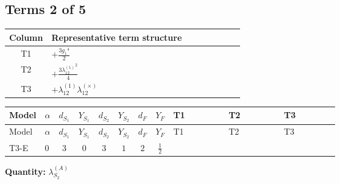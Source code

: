 \documentclass[8pt]{article}
\begin{document}
\begin{landscape}
\subsection*{Terms 2 of 5}
\begin{center}
\begin{tabular}{@{}c >{\raggedright\arraybackslash}p{0.82\linewidth}@{}}
\toprule
Column & Representative term structure \\
\midrule
T1 & \(\displaystyle +\frac{3 {g_1}^4}{2}\) \\
\midrule
T2 & \(\displaystyle +\frac{3 {\lambda_{12}^{(1)}}^2}{4}\) \\
\midrule
T3 & \(\displaystyle +{\lambda_{12}^{(1)}} {\lambda_{12}^{(\times)}}\) \\
\midrule
\bottomrule
\end{tabular}
\end{center}
\smallskip
\tiny
\begin{longtable}{@{}llcccccc >{\raggedright\arraybackslash}p{0.21\linewidth} >{\raggedright\arraybackslash}p{0.21\linewidth} >{\raggedright\arraybackslash}p{0.21\linewidth}@{}}
\toprule
Model & $\alpha$ & $d_{S_1}$ & $Y_{S_1}$ & $d_{S_2}$ & $Y_{S_2}$ & $d_F$ & $Y_F$ & T1 & T2 & T3 \\
\midrule
\endfirsthead
\toprule
Model & $\alpha$ & $d_{S_1}$ & $Y_{S_1}$ & $d_{S_2}$ & $Y_{S_2}$ & $d_F$ & $Y_F$ & T1 & T2 & T3 \\
\midrule
\endhead
T3-E & $0$ & $3$ & $0$ & $3$ & $1$ & $2$ & $\frac{1}{2}$ & \scriptsize\adjustbox{max width=\linewidth}{$\begin{gathered} +\frac{3 {g_1}^4}{2}\end{gathered}$} & \scriptsize\adjustbox{max width=\linewidth}{$\begin{gathered} +\frac{3 {\lambda_{12}^{(1)}}^2}{4}\end{gathered}$} & \scriptsize\adjustbox{max width=\linewidth}{$\begin{gathered} +{\lambda_{12}^{(1)}} {\lambda_{12}^{(\times)}}\end{gathered}$} \\
\midrule
\bottomrule
\end{longtable}
\clearpage
\noindent\textbf{Quantity: }$\lambda_{S_2}^{(A)}$\par\smallskip

\end{landscape}
\end{document}
